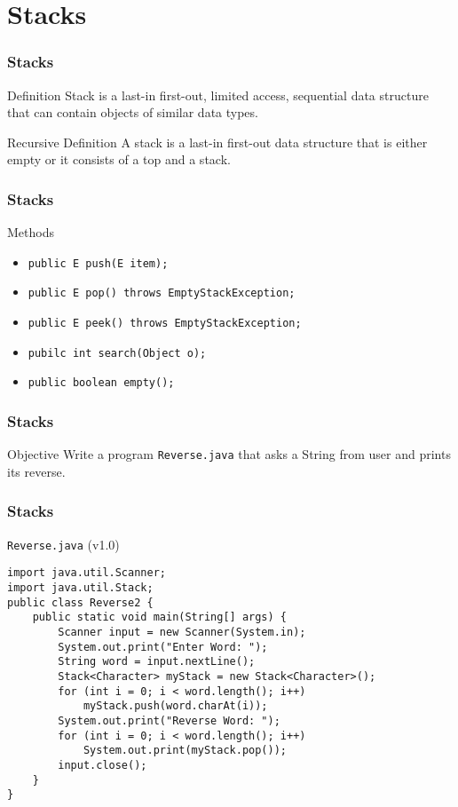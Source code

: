 \documentclass[10pt, compress]{beamer}
\begin{document}
\section{Stacks}

\begin{frame}[fragile]
	\frametitle{Stacks}
	\begin{block}{Definition}
		Stack is a \alert{last-in first-out}, limited access, sequential data structure that can contain objects of similar data types.
	\end{block}
	\begin{block}{Recursive Definition}
		A stack is a last-in first-out data structure that is either empty or it consists of a top and a stack.
	\end{block}
\end{frame}

\begin{frame}[fragile]
	\frametitle{Stacks}
	\begin{block}{Methods}
		\begin{itemize}
			\item[] \texttt{public E push(E item);}
			\item[] \texttt{public E pop() throws EmptyStackException;}
			\item[] \texttt{public E peek() throws EmptyStackException;}
			\item[] \texttt{pubilc int search(Object o);}
			\item[] \texttt{public boolean empty();}
		\end{itemize}
	\end{block}
\end{frame}

\begin{frame}[fragile]
	\frametitle{Stacks}
	\begin{block}{Objective}
		Write a program \texttt{Reverse.java} that asks a String from user and prints its reverse.
	\end{block}
\end{frame}

\begin{frame}[fragile]
	\frametitle{Stacks}
	\begin{block}{\texttt{Reverse.java} (v1.0)}
		\begin{verbatim}
import java.util.Scanner;
import java.util.Stack;
public class Reverse2 {
	public static void main(String[] args) {
		Scanner input = new Scanner(System.in);
		System.out.print("Enter Word: ");
		String word = input.nextLine();
		Stack<Character> myStack = new Stack<Character>();
		for (int i = 0; i < word.length(); i++)
			myStack.push(word.charAt(i));
		System.out.print("Reverse Word: ");
		for (int i = 0; i < word.length(); i++)
			System.out.print(myStack.pop());
		input.close();
	}
}
		\end{verbatim}
	\end{block}
\end{frame}
\end{document}

